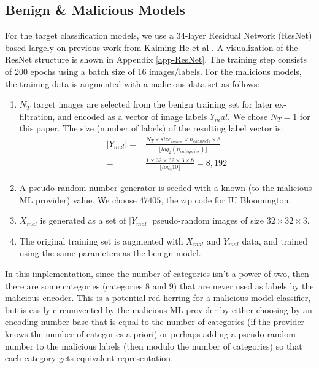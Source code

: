 \subsection{Benign \& Malicious Models}\label{subsec:benignmalicious}

For the target classification models, we use a 34-layer Residual Network (ResNet) based largely on previous work from Kaiming He et al \cite{DBLP:journals/corr/HeZRS15}.  A visualization of the ResNet structure is shown in Appendix \ref{app-ResNet}.  The training step consists of 200 epochs using a batch size of 16 images/labels.  For the malicious models, the training data is augmented with a malicious data set as follows:

\begin{enumerate}
    \item $N_T$ target images are selected from the benign training set for later ex-filtration, and encoded as a vector of image labels $Y_mal$.  We chose $N_T = 1$ for this paper.  The size (number of labels) of the resulting label vector is: 
    \begin{align*}
        \lvert Y_{mal} \rvert = & \frac{N_T \times size_{image} \times n_{channels} \times 8}{\lfloor log_2(n_{categories}) \rfloor} \\
        = & \frac{1 \times 32 \times 32 \times 3 \times 8}{\lfloor log_2 10 \rfloor} = 8,192
    \end{align*}
    \item A pseudo-random number generator is seeded with a known (to the malicious ML provider) value.  We choose $47405$, the zip code for IU Bloomington.
    \item $X_{mal}$ is generated as a set of $\lvert Y_{mal} \rvert$ pseudo-random images of size $32 \times 32 \times 3$.
    \item The original training set is augmented with $X_{mal}$ and $Y_{mal}$ data, and trained using the same parameters as the benign model.
\end{enumerate}

In this implementation, since the number of categories isn't a power of two, then there are some categories (categories 8 and 9) that are never used as labels by the malicious encoder.  This is a potential red herring for a malicious model classifier, but is easily circumvented by the malicious ML provider by either choosing by an encoding number base that is equal to the number of categories (if the provider knows the number of categories a priori) or perhaps adding a pseudo-random number to the malicious labels (then modulo the number of categories) so that each category gets equivalent representation.

